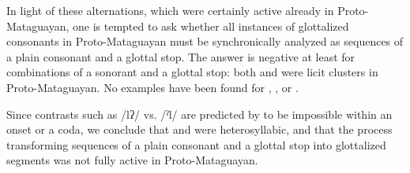 In light of these alternations, which were certainly active already in Proto-Mataguayan, one is tempted to ask whether all instances of glottalized consonants in Proto-Mataguayan must be synchronically analyzed as sequences of a plain consonant and a glottal stop. The answer is negative at least for combinations of a sonorant and a glottal stop: both  and  were licit clusters in Proto-Mataguayan. No examples have been found for , , or .

\begin{exe}
    \ex \soninlaw
    \ex \daylhuma
    \ex \doveula
    \ex \rat
\end{exe}

Since contrasts such as /lʔ/ vs. /ˀl/ are predicted by \citet{WK-CG-04} to be impossible within an onset or a coda, we conclude that  and  were heterosyllabic, and that the process transforming sequences of a plain consonant and a glottal stop into glottalized segments was not fully active in Proto-Mataguayan.

